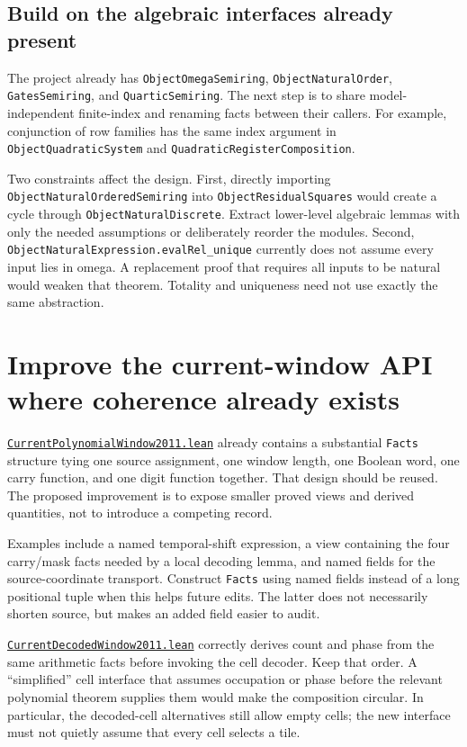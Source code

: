 \documentclass[11pt,letterpaper]{article}
\newcommand{\code}[1]{\nolinkurl{#1}}
\newcommand{\src}[2]{\href{https://github.com/VladimirReshetnikov/ProveIt/blob/60e9c5d620c6c387d932876cfa2d9376f64ea56c/Computability/DiophantineConsistency/Lean/DiophantineConsistency/#1.lean}{\code{#1.lean}}#2}
\begin{document}
\subsection{Build on the algebraic interfaces already present}

The project already has \code{ObjectOmegaSemiring},
\code{ObjectNaturalOrder}, \code{GatesSemiring}, and \code{QuarticSemiring}.
The next step is to share model-independent finite-index and renaming facts
between their callers. For example, conjunction of row families has the same
index argument in \code{ObjectQuadraticSystem} and
\code{QuadraticRegisterComposition}.

Two constraints affect the design. First, directly importing
\code{ObjectNaturalOrderedSemiring} into \code{ObjectResidualSquares} would
create a cycle through \code{ObjectNaturalDiscrete}. Extract lower-level
algebraic lemmas with only the needed assumptions or deliberately reorder the
modules. Second, \code{ObjectNaturalExpression.evalRel_unique} currently does
not assume every input lies in omega. A replacement proof that requires all
inputs to be natural would weaken that theorem. Totality and uniqueness need
not use exactly the same abstraction.

\section{Improve the current-window API where coherence already exists}

\src{CurrentPolynomialWindow2011}{ already contains a substantial
\code{Facts} structure tying one source assignment, one window length,
one Boolean word, one carry function, and one digit function together.}
That design should be reused. The proposed improvement is to expose smaller
proved views and derived quantities, not to introduce a competing record.

Examples include a named temporal-shift expression, a view containing the
four carry/mask facts needed by a local decoding lemma, and named fields for
the source-coordinate transport. Construct \code{Facts} using named fields
instead of a long positional tuple when this helps future edits. The latter
does not necessarily shorten source, but makes an added field easier to audit.

\src{CurrentDecodedWindow2011}{ correctly derives count and phase from the
same arithmetic facts before invoking the cell decoder.}
Keep that order. A ``simplified'' cell interface that assumes occupation or
phase before the relevant polynomial theorem supplies them would make the
composition circular. In particular, the decoded-cell alternatives still allow
empty cells; the new interface must not quietly assume that every cell selects
a tile.
\end{document}
